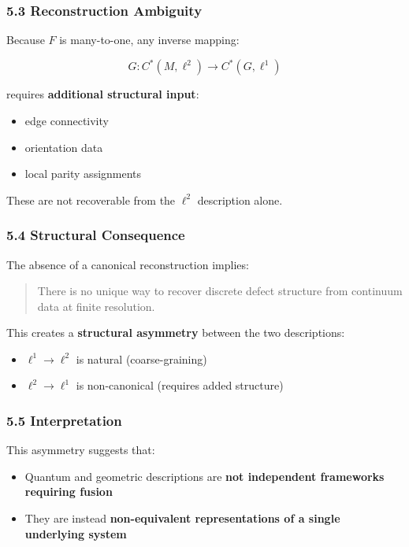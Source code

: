 \documentclass[
]{article}
\providecommand{\tightlist}{%
  \setlength{\itemsep}{0pt}\setlength{\parskip}{0pt}}
\begin{document}
\subsubsection{5.3 Reconstruction
Ambiguity}\label{reconstruction-ambiguity}

Because \(F\) is many-to-one, any inverse mapping:

\[G: C^*(M, \ell^2) \to C^*(G, \ell^1)\]

requires \textbf{additional structural input}:

\begin{itemize}
\tightlist
\item
  edge connectivity
\item
  orientation data
\item
  local parity assignments
\end{itemize}

These are not recoverable from the \(\ell^2\) description alone.

\subsubsection{5.4 Structural Consequence}\label{structural-consequence}

The absence of a canonical reconstruction implies:

\begin{quote}
There is no unique way to recover discrete defect structure from
continuum data at finite resolution.
\end{quote}

This creates a \textbf{structural asymmetry} between the two
descriptions:

\begin{itemize}
\tightlist
\item
  \(\ell^1 \to \ell^2\) is natural (coarse-graining)
\item
  \(\ell^2 \to \ell^1\) is non-canonical (requires added structure)
\end{itemize}

\subsubsection{5.5 Interpretation}\label{interpretation}

This asymmetry suggests that:

\begin{itemize}
\tightlist
\item
  Quantum and geometric descriptions are \textbf{not independent
  frameworks requiring fusion}
\item
  They are instead \textbf{non-equivalent representations of a single
  underlying system}
\end{itemize}
\end{document}

